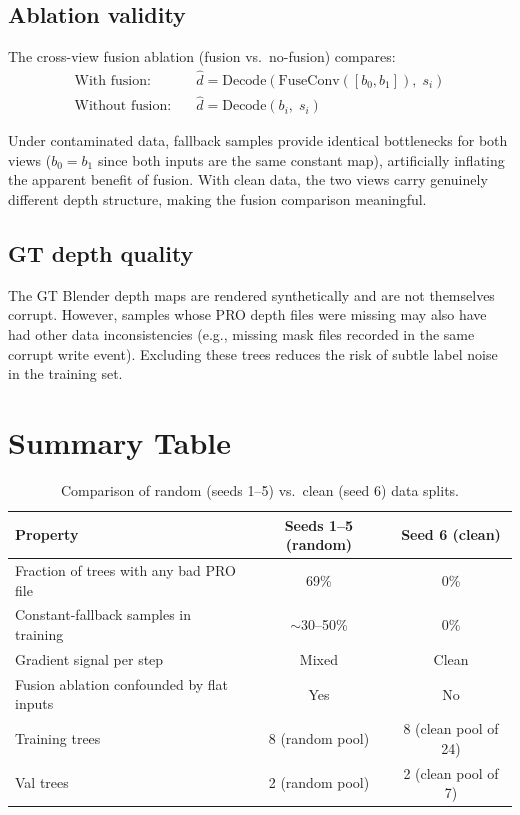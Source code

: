 \documentclass[11pt]{article}
\begin{document}
\subsection*{Ablation validity}

The cross-view fusion ablation (fusion vs.\ no-fusion) compares:
\begin{align*}
  \text{With fusion:}\quad    &\hat{d} = \text{Decode}(\text{FuseConv}([b_0, b_1]),\; s_i) \\
  \text{Without fusion:}\quad &\hat{d} = \text{Decode}(b_i,\; s_i)
\end{align*}

Under contaminated data, fallback samples provide identical bottlenecks
for both views ($b_0 = b_1$ since both inputs are the same constant map),
artificially inflating the apparent benefit of fusion.  With clean data,
the two views carry genuinely different depth structure, making the
fusion comparison meaningful.

\subsection*{GT depth quality}

The GT Blender depth maps are rendered synthetically and are not
themselves corrupt.  However, samples whose PRO depth files were missing
may also have had other data inconsistencies (e.g., missing mask files
recorded in the same corrupt write event).  Excluding these trees reduces
the risk of subtle label noise in the training set.

\section{Summary Table}

\begin{table}[h!]
\centering
\begin{tabular}{lcc}
\toprule
Property & Seeds 1--5 (random) & Seed 6 (clean) \\
\midrule
Fraction of trees with any bad PRO file & 69\% & 0\% \\
Constant-fallback samples in training   & $\sim$30--50\% & 0\% \\
Gradient signal per step                & Mixed & Clean \\
Fusion ablation confounded by flat inputs & Yes & No \\
Training trees & 8 (random pool) & 8 (clean pool of 24) \\
Val trees & 2 (random pool) & 2 (clean pool of 7) \\
\bottomrule
\end{tabular}
\caption{Comparison of random (seeds 1--5) vs.\ clean (seed 6) data splits.}
\end{table}
\end{document}
